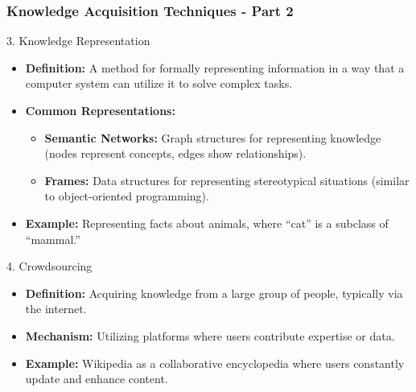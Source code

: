 \documentclass[aspectratio=169]{beamer}
\begin{document}
\begin{frame}[fragile]
    \frametitle{Knowledge Acquisition Techniques - Part 2}
    \begin{block}{3. Knowledge Representation}
        \begin{itemize}
            \item \textbf{Definition:} A method for formally representing information in a way that a computer system can utilize it to solve complex tasks.
            \item \textbf{Common Representations:}
            \begin{itemize}
                \item \textbf{Semantic Networks:} Graph structures for representing knowledge (nodes represent concepts, edges show relationships).
                \item \textbf{Frames:} Data structures for representing stereotypical situations (similar to object-oriented programming).
            \end{itemize}
            \item \textbf{Example:} Representing facts about animals, where ``cat'' is a subclass of ``mammal.''
        \end{itemize}
    \end{block}

    \begin{block}{4. Crowdsourcing}
        \begin{itemize}
            \item \textbf{Definition:} Acquiring knowledge from a large group of people, typically via the internet.
            \item \textbf{Mechanism:} Utilizing platforms where users contribute expertise or data.
            \item \textbf{Example:} Wikipedia as a collaborative encyclopedia where users constantly update and enhance content.
        \end{itemize}
    \end{block}
\end{frame}
\end{document}
